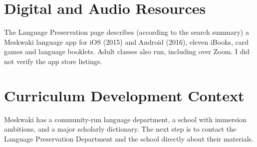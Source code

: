 \documentclass[12pt]{article}
\begin{document}
\section{Digital and Audio Resources}
The Language Preservation page describes (according to the search summary) a Meskwaki language app for iOS (2015) and Android (2016), eleven iBooks, card games and language booklets. Adult classes also run, including over Zoom. I did not verify the app store listings.

\section{Curriculum Development Context}
Meskwaki has a community-run language department, a school with immersion ambitions, and a major scholarly dictionary. The next step is to contact the Language Preservation Department and the school directly about their materials.
\end{document}
